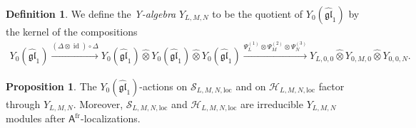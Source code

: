 \documentclass[10pt]{amsart}
\theoremstyle{definition}
\newtheorem{Proposition}[Theorem]{Proposition}
\newtheorem{Definition}[Theorem]{Definition}
\numberwithin{equation}{section}
\newcommand{\cH}{\mathcal{H}}
\newcommand{\cS}{\mathcal{S}}
\newcommand{\loc}{\mathrm{loc}}
\newcommand{\sA}{\mathsf{A}}
\newcommand{\id}{\operatorname{id}}
\begin{document}
\begin{Definition}
We define the \textit{Y-algebra} $Y_{L,M,N}$ to be the quotient of $Y_0(\widehat{\mathfrak{gl}}_1)$ by the kernel of the compositions
\begin{align}\label{truncation L,M,N}
Y_0(\widehat{\mathfrak{gl}}_1)\xrightarrow{(\Delta\otimes \id)\circ \Delta} Y_0(\widehat{\mathfrak{gl}}_1)\widehat\otimes Y_0(\widehat{\mathfrak{gl}}_1)\widehat\otimes Y_0(\widehat{\mathfrak{gl}}_1)\xrightarrow{\Psi^{(1)}_L\otimes \Psi^{(2)}_M\otimes\Psi^{(3)}_N} Y_{L,0,0}\widehat\otimes Y_{0,M,0}\widehat\otimes Y_{0,0,N}.
\end{align}
\end{Definition}

\begin{Proposition}\label{prop on more ex}
The $Y_0(\widehat{\mathfrak{gl}}_1)$-actions on $\cS_{L,M,N,\loc}$ and on $\cH_{L,M,N,\loc}$ factor through $Y_{L,M,N}$. Moreover, $\cS_{L,M,N,\loc}$ and $\cH_{L,M,N,\loc}$ are irreducible $Y_{L,M,N}$ modules after $\sA^{\mathrm{fr}}$-localizations.
\end{Proposition}
\end{document}
